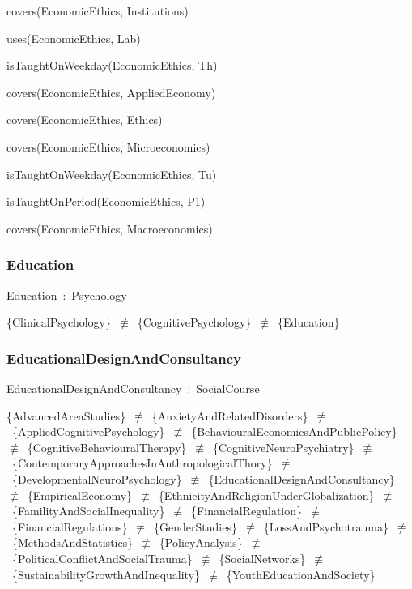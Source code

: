 \documentclass{article}
\begin{document}
covers(EconomicEthics, Institutions)

uses(EconomicEthics, Lab)

isTaughtOnWeekday(EconomicEthics, Th)

covers(EconomicEthics, AppliedEconomy)

covers(EconomicEthics, Ethics)

covers(EconomicEthics, Microeconomics)

isTaughtOnWeekday(EconomicEthics, Tu)

isTaughtOnPeriod(EconomicEthics, P1)

covers(EconomicEthics, Macroeconomics)

\subsubsection*{Education}

Education~:~Psychology

\{ClinicalPsychology\}~\ensuremath{\not\equiv}~\{CognitivePsychology\}~\ensuremath{\not\equiv}~\{Education\}

\subsubsection*{EducationalDesignAndConsultancy}

EducationalDesignAndConsultancy~:~SocialCourse

\{AdvancedAreaStudies\}~\ensuremath{\not\equiv}~\{AnxietyAndRelatedDisorders\}~\ensuremath{\not\equiv}~\{AppliedCognitivePsychology\}~\ensuremath{\not\equiv}~\{BehaviouralEconomicsAndPublicPolicy\}~\ensuremath{\not\equiv}~\{CognitiveBehaviouralTherapy\}~\ensuremath{\not\equiv}~\{CognitiveNeuroPsychiatry\}~\ensuremath{\not\equiv}~\{ContemporaryApproachesInAnthropologicalThory\}~\ensuremath{\not\equiv}~\{DevelopmentalNeuroPsychology\}~\ensuremath{\not\equiv}~\{EducationalDesignAndConsultancy\}~\ensuremath{\not\equiv}~\{EmpiricalEconomy\}~\ensuremath{\not\equiv}~\{EthnicityAndReligionUnderGlobalization\}~\ensuremath{\not\equiv}~\{FamilityAndSocialInequality\}~\ensuremath{\not\equiv}~\{FinancialRegulation\}~\ensuremath{\not\equiv}~\{FinancialRegulations\}~\ensuremath{\not\equiv}~\{GenderStudies\}~\ensuremath{\not\equiv}~\{LossAndPsychotrauma\}~\ensuremath{\not\equiv}~\{MethodsAndStatistics\}~\ensuremath{\not\equiv}~\{PolicyAnalysis\}~\ensuremath{\not\equiv}~\{PoliticalConflictAndSocialTrauma\}~\ensuremath{\not\equiv}~\{SocialNetworks\}~\ensuremath{\not\equiv}~\{SustainabilityGrowthAndInequality\}~\ensuremath{\not\equiv}~\{YouthEducationAndSociety\}
\end{document}
